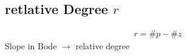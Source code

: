 \subsection{retlative Degree $r$}
    \begin{align*}
        r = \# p - \# z
    \end{align*}
    Slope in Bode $\rightarrow$ relative degree